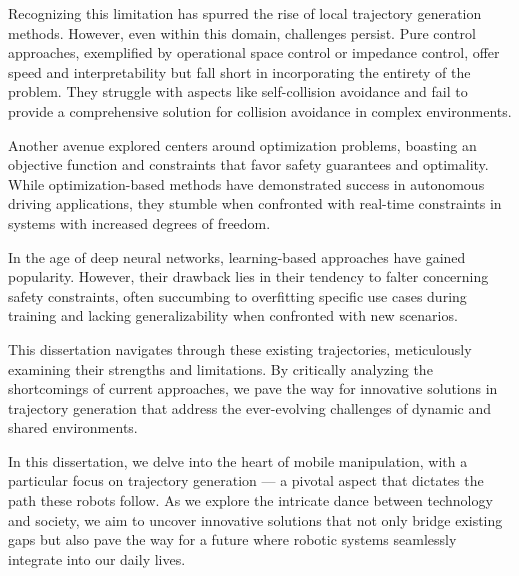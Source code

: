 Recognizing this limitation has spurred the rise of local trajectory generation
methods. However, even within this domain, challenges persist. Pure control
approaches, exemplified by operational space control or impedance control, offer
speed and interpretability but fall short in incorporating the entirety of the
problem. They struggle with aspects like self-collision avoidance and fail to
provide a comprehensive solution for collision avoidance in complex
environments.

Another avenue explored centers around optimization problems, boasting an
objective function and constraints that favor safety guarantees and optimality.
While optimization-based methods have demonstrated success in autonomous driving
applications, they stumble when confronted with real-time constraints in systems
with increased degrees of freedom.

In the age of deep neural networks, learning-based approaches have gained
popularity. However, their drawback lies in their tendency to falter concerning
safety constraints, often succumbing to overfitting specific use cases during
training and lacking generalizability when confronted with new scenarios.

This dissertation navigates through these existing trajectories, meticulously examining their strengths and limitations. By critically analyzing the shortcomings of current approaches, we pave the way for innovative solutions in trajectory generation that address the ever-evolving challenges of dynamic and shared environments.

In this dissertation, we delve into the heart of mobile manipulation, with a
particular focus on trajectory generation — a pivotal aspect that dictates the
path these robots follow. As we explore the intricate dance between technology
and society, we aim to uncover innovative solutions that not only bridge
existing gaps but also pave the way for a future where robotic systems
seamlessly integrate into our daily lives.





